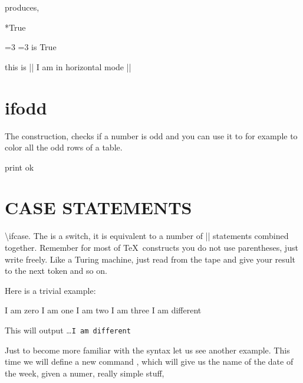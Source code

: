 produces,



\def\a{} 
\def\b{**} 
\def\c{True}

\if\a\b \relax True \fi
 

\def\z1{3}
\ifnum \z1=3  \string\z1=3  is True \fi

 this is |\ifhmode| I am in horizontal mode |\fi|



\section*{ifodd}


The  construction, checks if a number is odd and you can use it to for example to color 
all the odd rows of a table. 

\begin{teX}
   \ifodd  \z1  print ok \fi
\end{teX}

\section*{CASE STATEMENTS}

\begin{multicols}{2}
{\textbackslash ifcase.} The  is a switch, it is equivalent to a number of |\ifnum| statements combined together.
Remember for most of \TeX\  constructs you do not use parentheses, just write freely. Like a Turing machine,
just read from the tape and give your result to the next token and so on.

Here is a trivial example:
\end{multicols}

\begin{teX}
% 
    I am zero      %
   \or I am one    %
   \or I am two    %
   \or I am three  %
   \else 
      I am different 
\fi 
\end{teX}

This will output  \ldots \texttt{I am different}  


Just to become more familiar with the syntax let us see another example. This time we will define
a new command , which will give us the name of the date of the week, given a numer, really simple stuff,

\begin{comment}
\begin{texexample}{ifcase}{ifcase}
\def\weekday#1{
 \ifcase#1
   Sunday          		%
   \or Monday    		%
   \or Tuesday    	%
   \or Wednesday  	%
   \or Thursday     	%
   \or Friday  		%
   \or Saturday 		%
   \else 
      Error No: 212345, this is not a  weekday!}
 \fi\relax 
}
\end{texexample}
\end{comment}


